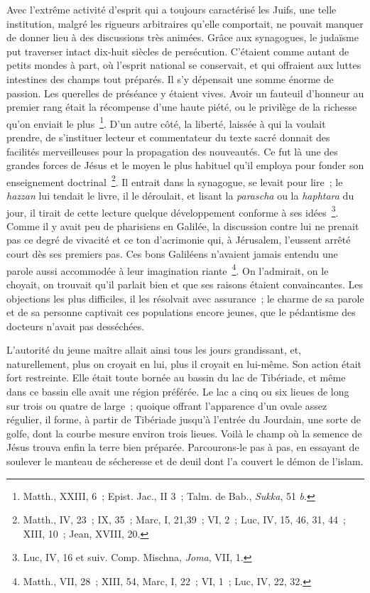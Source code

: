 \documentclass[french,twoside]{book} %
\begin{document}
Avec l’extrême activité d’esprit qui a toujours caractérisé les Juifs, une telle institution, malgré les rigueurs arbitraires qu’elle comportait, ne pouvait manquer de donner lieu à des discussions très animées. Grâce aux synagogues, le judaïsme put traverser intact dix-huit siècles de persécution. C’étaient comme autant de petits mondes à part, où l’esprit national se conservait, et qui offraient aux luttes intestines des champs tout préparés. Il s’y dépensait une somme énorme de passion. Les querelles de préséance y étaient vives. Avoir un fauteuil d’honneur au premier rang était la récompense d’une haute piété, ou le privilège de la richesse qu’on enviait le plus \footnote{ Matth., XXIII, 6 ; Epist. Jac., II 3 ; Talm. de Bab., {\itshape Sukka}, 51 {\itshape b}.}. D’un autre côté, la liberté, laissée à qui la voulait prendre, de s’instituer lecteur et commentateur du texte sacré donnait des facilités merveilleuses pour la propagation des nouveautés. Ce fut là une des grandes forces de Jésus et le moyen le plus habituel qu’il employa pour fonder son enseignement doctrinal \footnote{Matth., IV, 23 ; IX, 35 ; Marc, I, 21,39 ; VI, 2 ; Luc, IV, 15, 46, 31, 44 ; XIII, 10 ; Jean, XVIII, 20.}. Il entrait dans la synagogue, se levait pour lire ; le {\itshape hazzan} lui tendait le livre, il le déroulait, et lisant la {\itshape parascha} ou la {\itshape haphtara} du jour, il tirait de cette lecture quelque développement conforme à ses idées \footnote{ Luc, IV, 16 et suiv. Comp. Mischna, {\itshape Joma}, VII, 1.}. Comme il y avait peu de pharisiens en Galilée, la discussion contre lui ne prenait pas ce degré de vivacité et ce ton d’acrimonie qui, à Jérusalem, l’eussent arrêté court dès ses premiers pas. Ces bons Galiléens n’avaient jamais entendu une parole aussi accommodée à leur imagination riante \footnote{Matth., VII, 28 ; XIII, 54, Marc, I, 22 ; VI, 1 ; Luc, IV, 22, 32.}. On l’admirait, on le choyait, on trouvait qu’il parlait bien et que ses raisons étaient convaincantes. Les objections les plus difficiles, il les résolvait avec assurance ; le charme de sa parole et de sa personne captivait ces populations encore jeunes, que le pédantisme des docteurs n’avait pas desséchées.\par
L’autorité du jeune maître allait ainsi tous les jours grandissant, et, naturellement, plus on croyait en lui, plus il croyait en lui-même. Son action était fort restreinte. Elle était toute bornée au bassin du lac de Tibériade, et même dans ce bassin elle avait une région préférée. Le lac a cinq ou six lieues de long sur trois ou quatre de large ; quoique offrant l’apparence d’un ovale assez régulier, il forme, à partir de Tibériade jusqu’à l’entrée du Jourdain, une sorte de golfe, dont la courbe mesure environ trois lieues. Voilà le champ où la semence de Jésus trouva enfin la terre bien préparée. Parcourons-le pas à pas, en essayant de soulever le manteau de sécheresse et de deuil dont l’a couvert le démon de l’islam.\par
\end{document}
